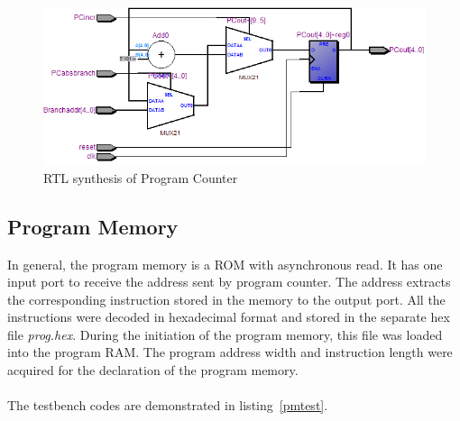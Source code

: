 		\begin{figure}[ht!]
		\centering
		\includegraphics[width = \textwidth]{Figures/counter}		
		\caption{RTL synthesis of Program Counter}
		\label {fig:counter}
	\end{figure}

\subsection{Program Memory} \label{Program Memory}

In general, the program memory is a ROM with asynchronous read. It has one input port to receive the address sent by program counter. The address extracts the corresponding instruction stored in the memory to the output port. All the instructions were decoded in hexadecimal format and stored in the separate hex file \textit{prog.hex}. During the initiation of the program memory, this file was loaded into the program RAM. The program address width and instruction length were acquired for the declaration of the program memory.\\\\
The testbench codes are demonstrated in listing~\ref{pmtest}.


